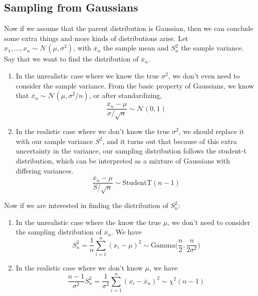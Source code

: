 \subsection{Sampling from Gaussians}

  Now if we assume that the parent distribution is Gaussian, then we can conclude some extra things and more kinds of distributions arise. Let $x_1, \ldots, x_n \sim \mathcal{N}(\mu, \sigma^2)$, with $\overline{x}_n$ the sample mean and $S^2_n$ the sample variance. Say that we want to find the distribution of $\overline{x}_n$. 
  \begin{enumerate}
    \item In the unrealistic case where we know the true $\sigma^2$, we don't even need to consider the sample variance. From the basic property of Gaussians, we know that $\overline{x}_n \sim \mathcal{N}(\mu, \sigma^2/n)$, or after standardizing, 
    \begin{equation}
      \frac{\overline{x}_n - \mu}{\sigma/\sqrt{n}} \sim \mathcal{N}(0, 1)
    \end{equation}
    \item In the realistic case where we don't know the true $\sigma^2$, we should replace it with our sample variance $S^2$, and it turns out that because of this extra uncertainty in the variance, our sampling distribution follows the student-t distribution, which can be interpreted as a mixture of Gaussians with differing variances. 
    \begin{equation}
      \frac{\overline{x}_n - \mu}{S/\sqrt{n}} \sim \mathrm{StudentT}(n-1)
    \end{equation}
  \end{enumerate}
  Now if we are interested in finding the distribution of $S^2_n$: 
  \begin{enumerate}
    \item In the unrealistic case where the know the true $\mu$, we don't need to consider the sampling distribution of $\overline{x}_n$. We have 
    \begin{equation}
      S^2_n = \frac{1}{n} \sum_{i=1}^n (x_i - \mu)^2 \sim \mathrm{Gamma}\Big( \frac{n}{2}, \frac{n}{2 \sigma^2} \Big)
    \end{equation}
    \item In the realistic case where we don't know $\mu$, we have 
    \begin{equation}
      \frac{n-1}{\sigma^2} S^2_n = \frac{1}{\sigma^2} \sum_{i=1}^n (x_i - \overline{x}_n )^2 \sim \chi^2 (n-1)
    \end{equation}
  \end{enumerate}

